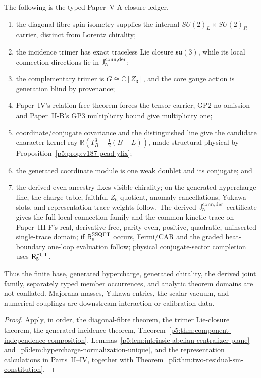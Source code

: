 \documentclass[12pt,a4paper]{article}
\begin{document}
\begin{theorem}
\label{p5:thm:reconstruction-package-sufficiency}
\label{p5:thm:gp2-forced-visible-sector-admissibility}
The following is the typed Paper--V-A closure ledger.
\begin{enumerate}[label=(\roman*), leftmargin=2em]
\item the diagonal-fibre spin-isometry supplies the internal
\(SU(2)_L\times SU(2)_R\) carrier, distinct from Lorentz chirality;
\item the incidence trimer has exact traceless Lie closure
\(\mathfrak{su}(3)\), while its local connection directions lie in
\(\mathsf J_5^{\rm conn,der}\);
\item the complementary trimer is \(G\cong\mathbb C[Z_3]\), and the
core gauge action is generation blind by provenance;
\item Paper~IV's relation-free theorem forces the tensor carrier; GP2
no-omission and Paper~II-B's GP3 multiplicity bound give multiplicity one;
\item coordinate/conjugate covariance and the distinguished line give the
candidate character-kernel ray
\(\mathbb R(T_R^3+\frac12(B-L))\), made structural-physical by
Proposition~\ref{p5:prop:v187-pcad-yfix};
\item the generated coordinate module is one weak doublet and its conjugate; and
\item the derived even ancestry fixes visible chirality; on
the generated hypercharge line, the charge table, faithful \(Z_6\) quotient,
anomaly cancellations, Yukawa slots, and representation trace weights follow.
The derived \(\mathsf J_5^{\rm conn,der}\) certificate gives the full local
connection family and the common kinetic trace on
Paper~III-F's real, derivative-free, parity-even, positive, quadratic,
uninserted single-trace domain; if
\(\mathsf R_5^{\rm SSQFT}\) occurs, Fermi/CAR and the graded heat-boundary one-loop
evaluation follow; physical conjugate-sector completion uses
\(\mathsf R_5^{\rm PCT}\).
\end{enumerate}
Thus the finite base, generated hypercharge, generated chirality, the derived
joint family, separately typed member occurrences, and analytic theorem domains
are not conflated.  Majorana
masses, Yukawa entries, the scalar vacuum, and numerical couplings are
downstream interaction or calibration data.
\end{theorem}

\begin{proof}
Apply, in order, the diagonal-fibre theorem, the trimer Lie-closure theorem,
the generated incidence theorem, Theorem~\ref{p5:thm:component-independence-composition},
Lemmas~\ref{p5:lem:intrinsic-abelian-centralizer-plane}
and~\ref{p5:lem:hypercharge-normalization-unique}, and the representation
calculations in Parts~II--IV, together with
Theorem~\ref{p5:thm:two-residual-sm-constitution}.
\end{proof}
\end{document}
